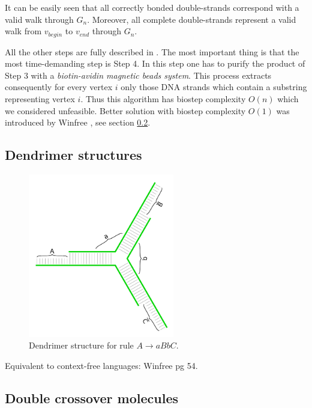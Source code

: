 		It can be easily seen that all correctly bonded double-strands correspond with a valid walk through $G_n$. Moreover, all complete double-strands represent a valid walk from $v_{begin}$ to $v_{end}$ through $G_n$.
		
		All the other steps are fully described in \cite{adleman94}. The most important thing is that the most time-demanding step is Step 4. In this step one has to purify the product of Step 3 with a {\em biotin-avidin magnetic beads system}. This process extracts consequently for every vertex $i$ only those DNA strands which contain a substring representing vertex $i$. Thus this algorithm has biostep complexity $O(n)$ which we considered unfeasible. Better solution with biostep complexity $O(1)$ was introduced by Winfree \cite{winfree_phd}, see section \ref{sec:double_crossover}.
	
	\subsection{Dendrimer structures}
	\label{sec:dendrimer}
		
		\begin{figure}[H]
		\begin{center}
			\includegraphics[width=0.568\textwidth]{./figures/strand_types/dendrimer.pdf}
			\caption{Dendrimer structure for rule $A\rightarrow aBbC$.}
			\label{fig:dendrimer}
		\end{center}
		\end{figure}
		
		Equivalent to context-free languages: Winfree pg 54.
	
	\subsection{Double crossover molecules}
	\label{sec:double_crossover}
		
